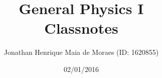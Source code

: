 \title{General Physics I \\ Classnotes}
\author{Jonathan Henrique Maia de Moraes (ID: 1620855)}
\date{02/01/2016}
\maketitle
